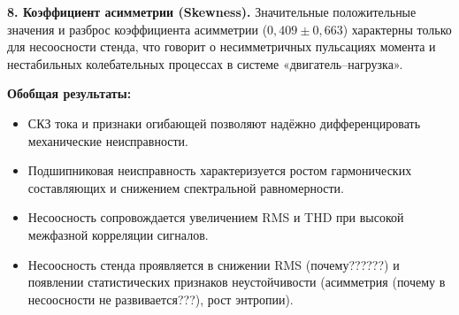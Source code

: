 \textbf{8. Коэффициент асимметрии (Skewness).}
Значительные положительные значения и разброс коэффициента асимметрии ($0{,}409 \pm 0{,}663$) характерны только для несоосности стенда, что говорит о несимметричных пульсациях момента и нестабильных колебательных процессах в системе «двигатель–нагрузка».

\bigskip
\textbf{Обобщая результаты:}
\begin{itemize}
    \item СКЗ тока и признаки огибающей позволяют надёжно дифференцировать механические неисправности.
    \item Подшипниковая неисправность характеризуется ростом гармонических составляющих и снижением спектральной равномерности.
    \item Несоосность сопровождается увеличением RMS и THD при высокой межфазной корреляции сигналов.
    \item Несоосность стенда проявляется в снижении RMS (почему??????) и появлении статистических признаков неустойчивости (асимметрия (почему в несоосности не развивается???), рост энтропии).
\end{itemize}
